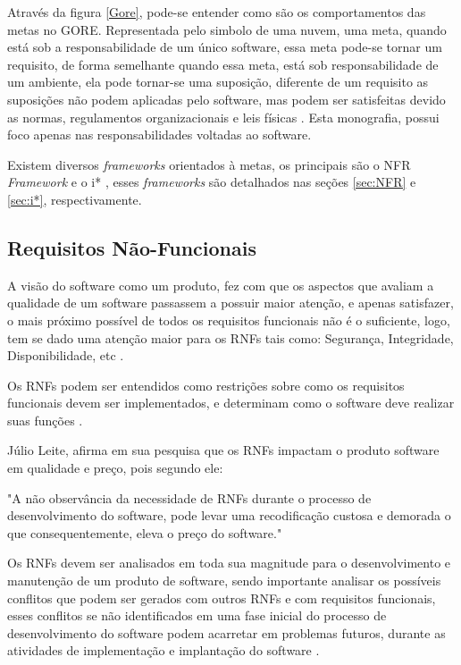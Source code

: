 \pagebreak

 Através da figura \ref{Gore}, pode-se entender como são os comportamentos das metas no GORE. Representada pelo simbolo de uma nuvem, uma meta, quando está sob a responsabilidade de um único software, essa meta pode-se tornar um requisito, de forma semelhante quando essa meta, está sob responsabilidade de um ambiente, ela pode tornar-se uma suposição, diferente de um requisito as suposições não podem aplicadas pelo software, mas podem ser satisfeitas devido as normas, regulamentos organizacionais e leis físicas \cite{van2001goal}. Esta monografia, possui foco apenas nas responsabilidades voltadas ao software.


Existem diversos \textit{frameworks} orientados à metas, os principais  são o NFR \textit{Framework} \cite{chung2012non} e o i* \cite{istarwiki20}, esses \textit{frameworks} são detalhados nas seções \ref{sec:NFR} e \ref{sec:i*}, respectivamente.

\subsection{Requisitos Não-Funcionais}
\label{subsec:requisitosNaoFuncionais}

A visão do software como um produto, fez com que os aspectos que avaliam a qualidade de um software passassem a possuir maior atenção, e apenas satisfazer, o mais próximo possível de todos os requisitos funcionais não é o suficiente, logo, tem se dado uma atenção maior para os RNFs tais como: Segurança, Integridade, Disponibilidade, etc \cite{cysneiros1997definindo}.

Os RNFs podem ser entendidos como restrições sobre como os requisitos funcionais devem ser implementados, e determinam como o software deve realizar suas funções \cite{sommerville1997requirements}.


Júlio Leite, afirma em sua pesquisa que os RNFs impactam o produto software em qualidade e preço, pois segundo ele:

\begin{citacao}
	"A não observância da necessidade de RNFs durante o processo de desenvolvimento do software, pode levar uma recodificação custosa e demorada o que consequentemente, eleva o preço do software." \cite[p. 2]{cysneiros1997definindo}
\end{citacao}

Os RNFs devem ser analisados em toda sua magnitude para o desenvolvimento e manutenção de um produto de software, sendo importante analisar os possíveis conflitos que podem ser gerados com outros RNFs e com requisitos funcionais, esses conflitos se não identificados em uma fase inicial do processo de desenvolvimento do software podem acarretar em problemas futuros, durante as atividades de implementação e implantação do software \cite{cysneiros1997definindo}. 


